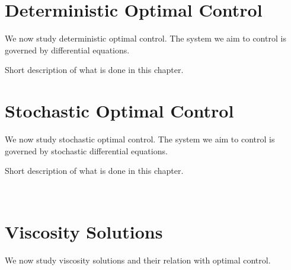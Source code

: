 \documentclass[12pt,a4paper]{book}
\numberwithin{theorem}{section}
\numberwithin{definition}{section}
\numberwithin{example}{section}
\numberwithin{exercise}{section}
\begin{document}
\newpage

\chapter{Deterministic Optimal Control}

We now study deterministic optimal control. The system we aim to control is governed by differential equations. 

Short description of what is done in this chapter.













\newpage

\chapter{Stochastic Optimal Control}

We now study stochastic optimal control. The system we aim to control is governed by stochastic differential equations. 

Short description of what is done in this chapter.

\





\newpage

\chapter{Viscosity Solutions}

We now study viscosity solutions and their relation with optimal control.



\newpage

\nocite{*}
\printbibliography
{}

\end{document}
